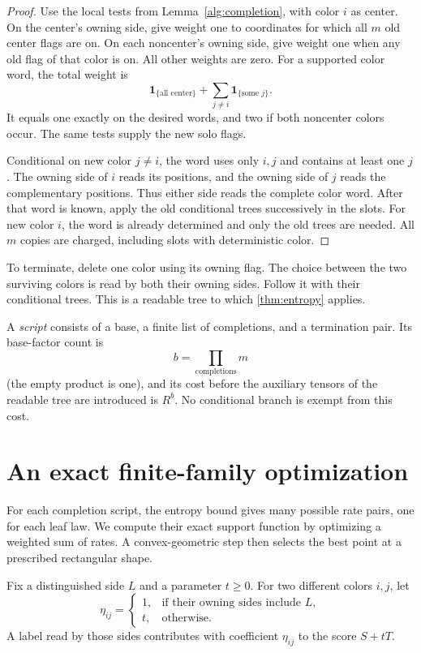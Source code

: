 \documentclass[11pt]{article}
\numberwithin{equation}{section}
\theoremstyle{definition}
\theoremstyle{remark}
\newcommand{\ind}{\mathbf 1}
\begin{document}
\begin{proof}
Use the local tests from Lemma~\ref{alg:completion}, with color \(i\)
as center.  On the center's owning side, give weight one to coordinates for which
all \(m\) old center flags are on.
On each noncenter's owning side, give weight one when any old flag of
that color is on.
All other weights are zero.
For a supported color word, the total weight is
\[
 \ind_{\{\text{all center}\}}+
 \sum_{j\ne i}\ind_{\{\text{some }j\}}.
\]
It equals one exactly on the desired words, and two if both noncenter
colors occur.
The same tests supply the new solo flags.

Conditional on new color \(j\ne i\), the word uses only \(i,j\)
and contains at least one \(j\).
The owning side of \(i\) reads its positions, and the owning side of
\(j\) reads the complementary positions.
Thus either side reads the complete color word.
After that word is known, apply the old conditional trees successively
in the slots.
For new color \(i\), the word is already determined and only the old
trees are needed.
All \(m\) copies are charged, including slots with deterministic color.
\end{proof}

To terminate, delete one color using its owning flag.
The choice between the two surviving colors is read by both their
owning sides.  Follow it with their conditional trees.
This is a readable tree to which \cref{thm:entropy} applies.

A \emph{script} consists of a base, a finite list of completions, and
a termination pair.
Its base-factor count is
\[
 b=\prod_{\text{completions}}m
\]
(the empty product is one), and its cost before the auxiliary tensors
of the readable tree are introduced is \(R^b\).
No conditional branch is exempt from this cost.

\section{An exact finite-family optimization}\label{sec:optimization}

For each completion script, the entropy bound gives many possible
rate pairs, one for each leaf law.  We compute their exact support
function by optimizing a weighted sum of rates.  A convex-geometric
step then selects the best point at a prescribed rectangular shape.

Fix a distinguished side \(L\) and a parameter \(t\ge0\).
For two different colors \(i,j\), let
\[
 \eta_{ij}=
 \begin{cases}
  1,&\text{if their owning sides include }L,\\
  t,&\text{otherwise}.
 \end{cases}
\]
A label read by those sides contributes with coefficient \(\eta_{ij}\)
to the score \(S+tT\).
\end{document}
